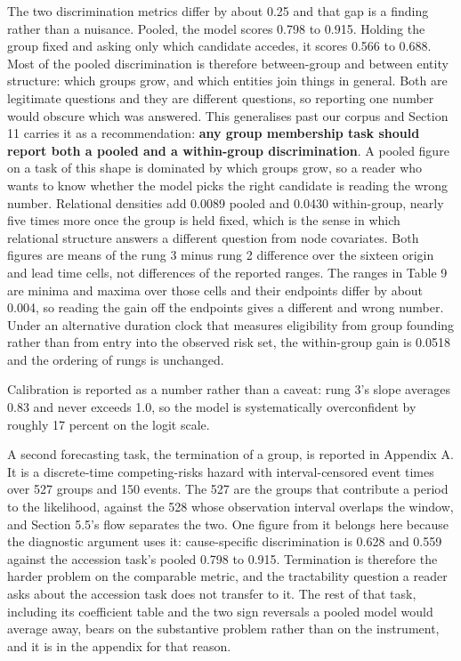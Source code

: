 \documentclass[twoside,11pt]{article}
\begin{document}
The two discrimination metrics differ by about 0.25 and that gap is a finding rather than a nuisance. Pooled, the model scores 0.798 to 0.915. Holding the group fixed and asking only which candidate accedes, it scores 0.566 to 0.688. Most of the pooled discrimination is therefore between-group and between entity structure: which groups grow, and which entities join things in general. Both are legitimate questions and they are different questions, so reporting one number would obscure which was answered. This generalises past our corpus and Section 11 carries it as a recommendation: \textbf{any group membership task should report both a pooled and a within-group discrimination}. A pooled figure on a task of this shape is dominated by which groups grow, so a reader who wants to know whether the model picks the right candidate is reading the wrong number. Relational densities add 0.0089 pooled and 0.0430 within-group, nearly five times more once the group is held fixed, which is the sense in which relational structure answers a different question from node covariates. Both figures are means of the rung 3 minus rung 2 difference over the sixteen origin and lead time cells, not differences of the reported ranges. The ranges in Table 9 are minima and maxima over those cells and their endpoints differ by about 0.004, so reading the gain off the endpoints gives a different and wrong number. Under an alternative duration clock that measures eligibility from group founding rather than from entry into the observed risk set, the within-group gain is 0.0518 and the ordering of rungs is unchanged.

Calibration is reported as a number rather than a caveat: rung 3's slope averages 0.83 and never exceeds 1.0, so the model is systematically overconfident by roughly 17 percent on the logit scale.

A second forecasting task, the termination of a group, is reported in Appendix A. It is a discrete-time competing-risks hazard with interval-censored event times over 527 groups and 150 events. The 527 are the groups that contribute a period to the likelihood, against the 528 whose observation interval overlaps the window, and Section 5.5's flow separates the two. One figure from it belongs here because the diagnostic argument uses it: cause-specific discrimination is 0.628 and 0.559 against the accession task's pooled 0.798 to 0.915. Termination is therefore the harder problem on the comparable metric, and the tractability question a reader asks about the accession task does not transfer to it. The rest of that task, including its coefficient table and the two sign reversals a pooled model would average away, bears on the substantive problem rather than on the instrument, and it is in the appendix for that reason.
\end{document}
